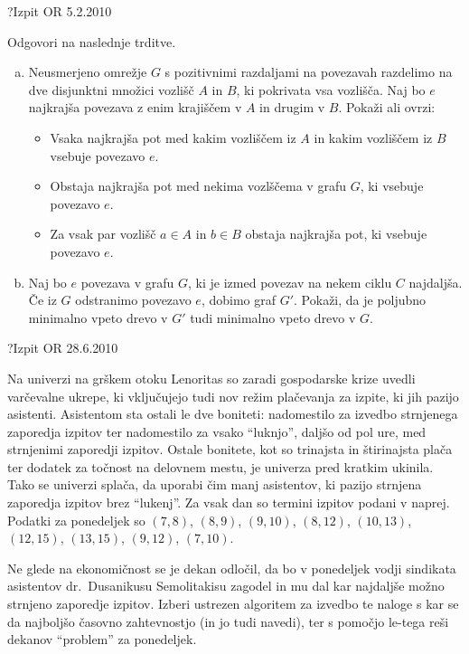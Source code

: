 \begin{naloga}{?}{Izpit OR 5.2.2010}
\begin{vprasanje}
Odgovori na naslednje trditve.
\begin{enumerate}[(a)]
\item Neusmerjeno omrežje $G$ s pozitivnimi razdaljami na povezavah
razdelimo na dve disjunktni množici vozlišč $A$ in $B$,
ki pokrivata vsa vozlišča.
Naj bo $e$ najkrajša povezava z enim krajiščem v $A$ in drugim v $B$.
Pokaži ali ovrzi:
    \begin{itemize}
    \item Vsaka najkrajša pot med kakim vozliščem iz $A$
    in kakim vozliščem iz $B$ vsebuje povezavo $e$.
    \item Obstaja najkrajša pot med nekima vozlščema v grafu $G$,
    ki vsebuje povezavo $e$.
    \item Za vsak par vozlišč $a \in A$ in $b \in B$ obstaja najkrajša pot,
    ki vsebuje povezavo $e$.
    \end{itemize}
\item Naj bo $e$ povezava v grafu $G$,
ki je izmed povezav na nekem ciklu $C$ najdaljša.
Če iz $G$ odstranimo povezavo $e$, dobimo graf $G'$.
Pokaži, da je poljubno minimalno vpeto drevo v $G'$
tudi minimalno vpeto drevo v $G$.
\end{enumerate}
\end{vprasanje}
\begin{odgovor}
\end{odgovor}
\end{naloga}


\begin{naloga}{?}{Izpit OR 28.6.2010}
\begin{vprasanje}
Na univerzi na grškem otoku Lenoritas
so zaradi gospodarske krize uvedli varčevalne ukrepe,
ki vključujejo tudi nov režim plačevanja za izpite,
ki jih pazijo asistenti.
Asistentom sta ostali le dve boniteti:
nadomestilo za izvedbo strnjenega zaporedja izpitov
ter nadomestilo za vsako ``luknjo'', daljšo od pol ure,
med strnjenimi zaporedji izpitov.
Ostale bonitete,
kot so trinajsta in štirinajsta plača
ter dodatek za točnost na delovnem mestu,
je univerza pred kratkim ukinila.
Tako se univerzi splača, da uporabi čim manj asistentov,
ki pazijo strnjena zaporedja izpitov brez ``lukenj''.
Za vsak dan so termini izpitov podani v naprej.
Podatki za ponedeljek so $(7, 8)$, $(8, 9)$, $(9, 10)$, $(8, 12)$,
$(10, 13)$, $(12, 15)$, $(13, 15)$, $(9, 12)$, $(7, 10)$.

Ne glede na ekonomičnost se je dekan odločil,
da bo v ponedeljek vodji sindikata asistentov dr.~Dusanikusu Semolitakisu
zagodel in mu dal kar najdaljše možno strnjeno zaporedje izpitov.
Izberi ustrezen algoritem za izvedbo te naloge
s kar se da najboljšo časovno zahtevnostjo (in jo tudi navedi),
ter s pomočjo le-tega reši dekanov ``problem'' za ponedeljek.

\end{vprasanje}
\begin{odgovor}
\end{odgovor}
\end{naloga}


